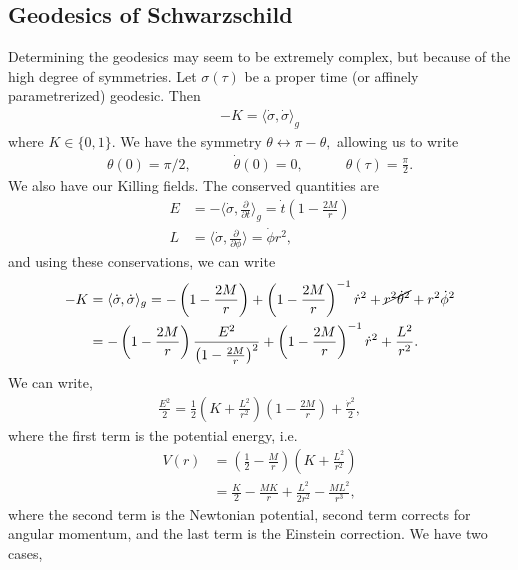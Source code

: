 \documentclass{article}
\numberwithin{equation}{section}
\begin{document}
\subsection{Geodesics of Schwarzschild}
Determining the geodesics may seem to be extremely complex, but because of the high degree of symmetries. Let $\sigma (\tau)$ be a proper time (or affinely parametrerized) geodesic. Then 
\begin{align*}
    -K = \langle \dot{\sigma},\dot{\sigma}\rangle_g
\end{align*}
where $K\in\{0,1\}.$ We have the symmetry $\theta \leftrightarrow \pi - \theta,$ allowing us to write 
\begin{align*}
    \theta(0) = \pi/2,\quad\quad\quad \dot{\theta}(0) = 0,\quad\quad\quad \theta(\tau) = \frac{\pi}{2}.
\end{align*}
We also have our Killing fields. The conserved quantities are 
\begin{align*}
    E &= -\langle \dot{\sigma},\frac{\partial}{\partial t}\rangle_g = \dot{t}\left(1 - \frac{2M}{r}\right) \\ 
    L &= \langle \dot{\sigma},\frac{\partial}{\partial \phi}\rangle = \dot{\phi} r^2, 
\end{align*}
and using these conservations, we can write 
\begin{align*}
    -K &= \langle \dot{\sigma},\dot{\sigma}\rangle_g = - \left(1-\frac{2M}{r}\right) + \left(1-\frac{2M}{r}\right)^{-1} \dot{r}^2 + \cancel{r^2\dot{\theta}^2} + r^2\dot{\phi}^2 \\ 
    &= -\left(1-\frac{2M}{r}\right) \frac{E^2}{\left(1-\frac{2M}{r}\right)^2} + \left(1-\frac{2M}{r}\right)^{-1}\dot{r}^2 + \frac{L^2}{r^2}.
\end{align*}
We can write,
\begin{align*}
    \frac{E^2}{2} = \frac{1}{2}\left(K + \frac{L^2}{r^2}\right)\left(1-\frac{2M}{r}\right) + \frac{\dot{r}^2}{2},
\end{align*}
where the first term is the potential energy, i.e. 
\begin{align*}
    V(r) &= \left(\frac{1}{2} - \frac{M}{r}\right)\left(K + \frac{L^2}{r^2}\right) \\ 
    &= \frac{K}{2} - \frac{MK}{r} + \frac{L^2}{2r^2} - \frac{ML^2}{r^3},
\end{align*}
where the second term is the Newtonian potential, second term corrects for angular momentum, and the last term is the Einstein correction. We have two cases,
\end{document}
